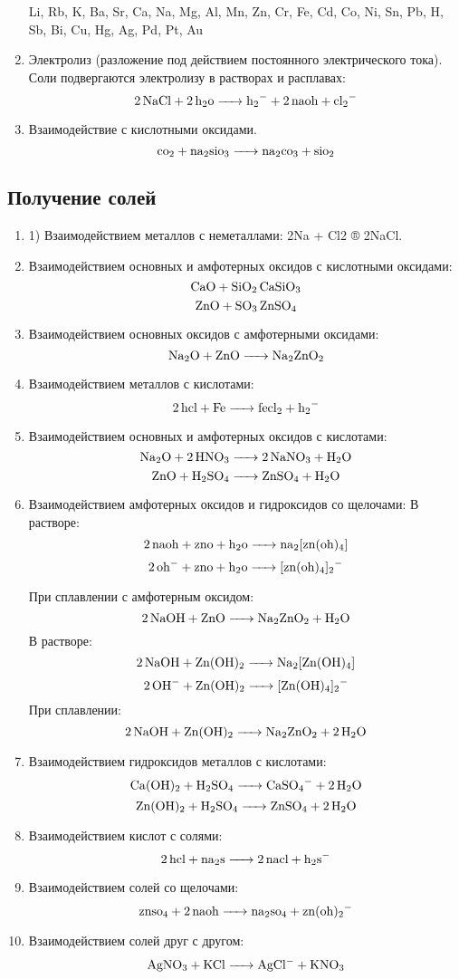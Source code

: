 \begin{enumerate}
        \small
        Li, Rb, K, Ba, Sr, Ca, Na, Mg, Al, Mn, Zn, Cr, Fe, Cd, Co, Ni, Sn, Pb, H, Sb, Bi, Cu, Hg, Ag, Pd, Pt, Au
    \item Электролиз (разложение под действием постоянного электрического тока). Соли подвергаются электролизу в растворах и расплавах:
        $$\ce{2NaCl + 2h2o -> h2- + 2naoh + cl2-}$$
    \item Взаимодействие с кислотными оксидами.
        $$\ce{co2 + na2sio3 -> na2co3 + sio2}$$

\end{enumerate}

\subsection{Получение солей}

\begin{enumerate}
    \item   1) Взаимодействием металлов с неметаллами:
        2Na + Cl2 ® 2NaCl.
    \item Взаимодействием основных и амфотерных оксидов с кислотными оксидами:
        $$\ce{CaO + SiO2 CaSiO3}$$
        $$\ce{ZnO + SO3 ZnSO4}$$
    \item Взаимодействием основных оксидов с амфотерными оксидами:
        $$\ce{Na2O + ZnO -> Na2ZnO2}$$
    \item Взаимодействием металлов с кислотами:
        $$\ce{2hcl + Fe -> fecl2 + h2-}$$
    \item Взаимодействием основных и амфотерных оксидов с кислотами:
        $$\ce{Na2O + 2HNO3 -> 2NaNO3 + H2O}$$
        $$\ce{ZnO + H2SO4 -> ZnSO4 + H2O}$$
    \item Взаимодействием амфотерных оксидов и гидроксидов со щелочами:
        В растворе:
        $$\ce{2naoh + zno + h2o -> na2[zn(oh)4]}$$
        $$\ce{2oh- + zno + h2o -> [zn(oh)4]2-}$$

        При сплавлении с амфотерным оксидом:
        $$\ce{2NaOH + ZnO -> Na2ZnO2 + H2O}$$
        В растворе:
        $$\ce{2NaOH + Zn(OH)2 -> Na2[Zn(OH)4]}$$
        $$\ce{2OH-  +  Zn(OH)2 -> [Zn(OH)4]2-}$$
        При сплавлении:
        $$\ce{2NaOH + Zn(OH)2 -> Na2ZnO2 + 2H2O}$$
    \item Взаимодействием гидроксидов металлов с кислотами:
        $$\ce{Ca(OH)2 + H2SO4 -> CaSO4- + 2H2O}$$
        $$\ce{Zn(OH)2 + H2SO4 -> ZnSO4 + 2H2O}$$
    \item Взаимодействием кислот с солями:
        $$\ce{2hcl + na2s -> 2nacl + h2s-}$$
    \item Взаимодействием солей со щелочами:
        $$\ce{znso4 + 2naoh -> na2so4 + zn(oh)2-}$$
    \item Взаимодействием солей друг с другом:
        $$\ce{AgNO3 + KCl -> AgCl- + KNO3}$$
\end{enumerate}

\clearpage
